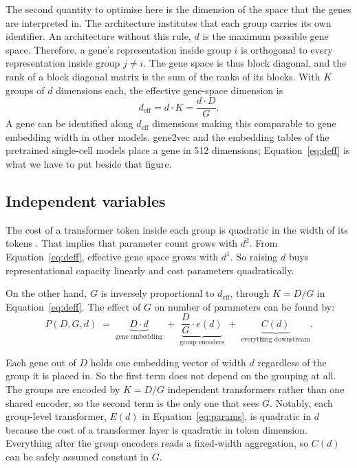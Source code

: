 The second quantity to optimise here is the dimension of the space that the 
genes are interpreted in. The architecture institutes that each group carries 
its own identifier. An architecture without this rule, $d$ is the maximum 
possible gene space. Therefore, a gene's representation inside group $i$ is 
orthogonal to every representation inside group $j \neq i$. The gene space is
thus block diagonal, and the rank of a block diagonal matrix is the sum of the 
ranks of its blocks. With $K$ groups of $d$ dimensions each, the effective 
gene-space dimension is
\begin{equation}
d_{\mathrm{eff}} = d \cdot K = \frac{d \cdot D}{G}.
\label{eq:deff}
\end{equation}
A gene can be identified along $d_{\mathrm{eff}}$ dimensions making this comparable to 
gene embedding width in other models. gene2vec and the embedding tables of the 
pretrained single-cell models place a gene in 512 dimensions; 
Equation~\ref{eq:deff} is what we have to put beside that figure.

\subsection{Independent variables}

The cost of a transformer token inside each group is quadratic in the width of 
its tokens \citep{vaswani2017attention}. That implies that parameter count grows with $d^2$.
From Equation~\ref{eq:deff}, effective gene space grows with $d^1$. So raising 
$d$ buys representational capacity linearly and cost parameters quadratically.

On the other hand, $G$ is inversely proportional to $d_{\mathrm{eff}}$, through 
$K = D/G$ in Equation~\ref{eq:deff}. The effect of $G$ on number of parameters 
can be found by:
\begin{equation}
P(D, G, d) \;=\; \underbrace{D \cdot d}_{\text{gene embedding}}
\;+\; \underbrace{\frac{D}{G} \cdot e(d)}_{\text{group encoders}}
\;+\; \underbrace{C(d)}_{\text{everything downstream}} .
\label{eq:params}
\end{equation}

Each gene out of $D$ holds one embedding vector of width $d$ regardless of the 
group it is placed in. So the first term does not depend on the grouping at all. 
The groups are encoded by $K = D/G$ independent transformers rather than one shared
encoder, so the second term is the only one that sees $G$. Notably, each
group-level transformer, $E(d)$ in Equation~\ref{eq:params}, is quadratic in $d$ because the cost of a 
transformer layer is quadratic in token dimension. Everything after the group
encoders reads a fixed-width aggregation, so $C(d)$ can be safely assumed
constant in $G$.

